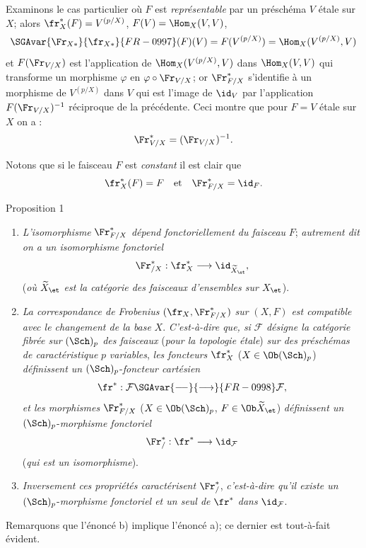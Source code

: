 Examinons le cas particulier où $F$ est \emph{représentable} par un préschéma $V$ étale sur $X$; alors $\fr_X^*(F)=V^{(p/X)}$, $F(V)=\Hom_X(V,V)$,
\[
\SGAvar{\Fr_{X*}}{\fr_{X*}}{FR-0997}(F)(V)=F(V^{(p/X)})=\Hom_X(V^{(p/X)},V)
\]
et $F(\Fr_{V/X})$ est l'application de $\Hom_X(V^{(p/X)},V)$ dans $\Hom_X(V,V)$ qui transforme un morphisme $\varphi$ en $\varphi\circ\Fr_{V/X}$; or $\Fr^*_{F/X}$ s'identifie à un morphisme de $V^{(p/X)}$ dans $V$ qui est l'image de $\id_V$ par l'application $F(\Fr_{V/X})^{-1}$ réciproque de la précédente. Ceci montre que pour $F=V$ étale sur $X$ on a :
\[
\Fr^*_{V/X}=(\Fr_{V/X})^{-1}.
\]

Notons que si le faisceau $F$ est \emph{constant} il est clair que
\[
\fr_X^*(F)=F
\quad\text{et}\quad
\Fr^*_{F/X}=\id_F.
\]

\begin{statement}{Proposition 1}
\begin{enumerate}[label=\alph*)]
\item \emph{L'isomorphisme} $\Fr^*_{F/X}$ \emph{dépend fonctoriellement du faisceau} $F$; \emph{autrement dit on a un isomorphisme fonctoriel}
\[
\Fr^*_{/X}:\fr_X^*\longrightarrow \id_{\widetilde X_{\et}},
\]
(\emph{où} $\widetilde X_{\et}$ \emph{est la catégorie des faisceaux d'ensembles sur} $X_{\et}$).
\item \emph{La correspondance de Frobenius} $(\fr_X,\Fr^*_{F/X})$ \emph{sur} $(X,F)$ \emph{est compatible avec le changement de la base} $X$. \emph{C'est-à-dire que, si} $\mathcal{F}$ \emph{désigne la catégorie fibrée sur} $(\Sch)_p$ \emph{des faisceaux} (\emph{pour la topologie étale}) \emph{sur des préschémas de caractéristique} $p$ \emph{variables}, \emph{les foncteurs} $\fr_X^*$ ($X\in\Ob(\Sch)_p$) \emph{définissent un} $(\Sch)_p$-\emph{foncteur cartésien}
\[
\fr^*: \mathcal{F}\SGAvar{\relbar\joinrel\relbar}{\longrightarrow}{FR-0998}\mathcal{F},
\]
\emph{et les morphismes} $\Fr^*_{F/X}$ ($X\in\Ob(\Sch)_p$, $F\in\Ob\widetilde X_{\et}$) \emph{définissent un} $(\Sch)_p$-\emph{morphisme fonctoriel}
\[
\Fr^*_{/}:\fr^*\longrightarrow\id_{\mathcal{F}}
\]
(\emph{qui est un isomorphisme}).
\item \emph{Inversement ces propriétés caractérisent} $\Fr^*_{/}$, \emph{c'est-à-dire qu'il existe un} $(\Sch)_p$-\emph{morphisme fonctoriel et un seul de} $\fr^*$ \emph{dans} $\id_{\mathcal{F}}$.
\end{enumerate}
\end{statement}

Remarquons que l'énoncé b) implique l'énoncé a); ce dernier est tout-à-fait évident.


